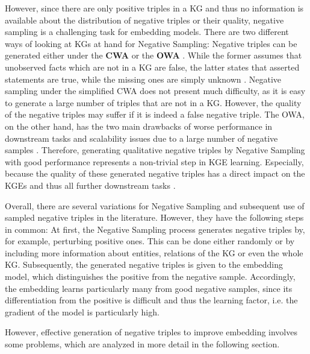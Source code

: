 However, since there are only positive triples in a \ac{KG} and thus no information is available about the distribution of negative triples or their quality, negative sampling is a challenging task for embedding models.
There are two different ways of looking at \acp{KG} at hand for Negative Sampling:
Negative triples can be generated either under the \textbf{\ac{CWA}} or the \textbf{\ac{OWA}} \cite{qiannegative}.
While the former assumes that unobserved facts which are not in a \ac{KG} are false, the latter states that asserted statements are true, while the missing ones are simply unknown \cite{arnaout2020enriching, qiannegative}.
Negative sampling under the simplified \ac{CWA} does not present much difficulty, as it is easy to generate a large number of triples that are not in a \ac{KG}.
However, the quality of the negative triples may suffer if it is indeed a false negative triple.
The \ac{OWA}, on the other hand, has the two main drawbacks of worse performance in downstream tasks and scalability issues due to a large number of negative samples \cite{qiannegative}.
Therefore, generating qualitative negative triples by Negative Sampling with good performance represents a non-trivial step in \ac{KGE} learning.
Especially, because the quality of these generated negative triples has a direct impact on the \acp{KGE} and thus all further downstream tasks \cite{qiannegative}.

Overall, there are several variations for Negative Sampling and subsequent use of sampled negative triples in the literature.
However, they have the following steps in common:
At first, the Negative Sampling process generates negative triples by, for example, perturbing positive ones.
This can be done either randomly or by including more information about entities, relations of the \ac{KG} or even the whole \ac{KG}.
Subsequently, the generated negative triples is given to the embedding model, which distinguishes the positive from the negative sample.
Accordingly, the embedding learns particularly many from good negative samples, since its differentiation from the positive is difficult and thus the learning factor, i.e. the gradient of the model is particularly high.

However, effective generation of negative triples to improve embedding involves some problems, which are analyzed in more detail in the following section.




